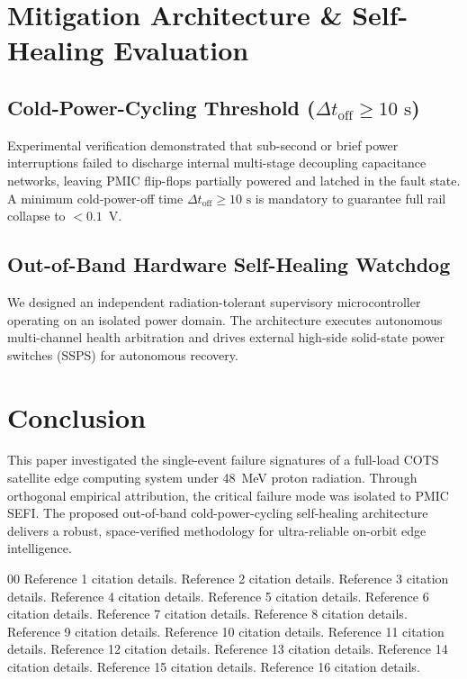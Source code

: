\documentclass[conference]{IEEEtran}
\begin{document}
\section{Mitigation Architecture \& Self-Healing Evaluation}
\subsection{Cold-Power-Cycling Threshold ($\Delta t_{\text{off}} \ge 10\text{ s}$)}
Experimental verification demonstrated that sub-second or brief power interruptions failed to discharge internal multi-stage decoupling capacitance networks, leaving PMIC flip-flops partially powered and latched in the fault state. A minimum cold-power-off time $\Delta t_{\text{off}} \ge 10\text{ s}$ is mandatory to guarantee full rail collapse to $<0.1$~V.

\subsection{Out-of-Band Hardware Self-Healing Watchdog}
We designed an independent radiation-tolerant supervisory microcontroller operating on an isolated power domain. The architecture executes autonomous multi-channel health arbitration and drives external high-side solid-state power switches (SSPS) for autonomous recovery.

\section{Conclusion}
This paper investigated the single-event failure signatures of a full-load COTS satellite edge computing system under 48~MeV proton radiation. Through orthogonal empirical attribution, the critical failure mode was isolated to PMIC SEFI. The proposed out-of-band cold-power-cycling self-healing architecture delivers a robust, space-verified methodology for ultra-reliable on-orbit edge intelligence.

\begin{thebibliography}{00}
 Reference 1 citation details.
 Reference 2 citation details.
 Reference 3 citation details.
 Reference 4 citation details.
 Reference 5 citation details.
 Reference 6 citation details.
 Reference 7 citation details.
 Reference 8 citation details.
 Reference 9 citation details.
 Reference 10 citation details.
 Reference 11 citation details.
 Reference 12 citation details.
 Reference 13 citation details.
 Reference 14 citation details.
 Reference 15 citation details.
 Reference 16 citation details.
\end{thebibliography}
\end{document}

